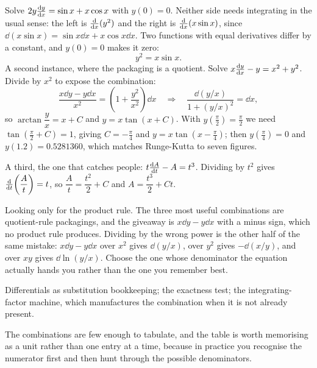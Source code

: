 \begin{worked}
Solve $2y\frac{\mathrm{d}y}{\mathrm{d}x}=\sin x+x\cos x$ with $y(0)=0$. Neither side needs integrating in the usual sense: the left is $\frac{\mathrm{d}}{\mathrm{d}x}(y^{2})$ and the right is $\frac{\mathrm{d}}{\mathrm{d}x}(x\sin x)$, since $\dd(x\sin x)=\sin x\dd x+x\cos x\dd x$. Two functions with equal derivatives differ by a constant, and $y(0)=0$ makes it zero:
\[y^{2}=x\sin x.\]
A second instance, where the packaging is a quotient. Solve $x\frac{\mathrm{d}y}{\mathrm{d}x}-y=x^{2}+y^{2}$. Divide by $x^{2}$ to expose the combination:
\[\frac{x\dd y-y\dd x}{x^{2}}=\left(1+\frac{y^{2}}{x^{2}}\right)\dd x\quad\Longrightarrow\quad \frac{\dd(y/x)}{1+(y/x)^{2}}=\dd x,\]
so $\arctan\dfrac yx=x+C$ and $y=x\tan(x+C)$. With $y(\tfrac\pi2)=\tfrac\pi2$ we need $\tan(\tfrac\pi2+C)=1$, giving $C=-\tfrac\pi4$ and $y=x\tan\!\left(x-\tfrac\pi4\right)$; then $y(\tfrac\pi4)=0$ and $y(1.2)=0.5281360$, which matches Runge-Kutta to seven figures.

A third, the one that catches people: $t\frac{\mathrm{d}A}{\mathrm{d}t}-A=t^{3}$. Dividing by $t^{2}$ gives $\frac{\mathrm{d}}{\mathrm{d}t}\!\left(\dfrac At\right)=t$, so $\dfrac At=\dfrac{t^{2}}{2}+C$ and $A=\dfrac{t^{3}}{2}+Ct$.
\end{worked}

\begin{trap}
Looking only for the product rule. The three most useful combinations are quotient-rule packagings, and the giveaway is $x\dd y-y\dd x$ with a minus sign, which no product rule produces. Dividing by the wrong power is the other half of the same mistake: $x\dd y-y\dd x$ over $x^{2}$ gives $\dd(y/x)$, over $y^{2}$ gives $-\dd(x/y)$, and over $xy$ gives $\dd\ln(y/x)$. Choose the one whose denominator the equation actually hands you rather than the one you remember best.
\end{trap}

\begin{seealsob}Differentials as substitution bookkeeping; the exactness test; the integrating-factor machine, which manufactures the combination when it is not already present.\end{seealsob}

The combinations are few enough to tabulate, and the table is worth memorising as a unit rather than one entry at a time, because in practice you recognise the numerator first and then hunt through the possible denominators.

